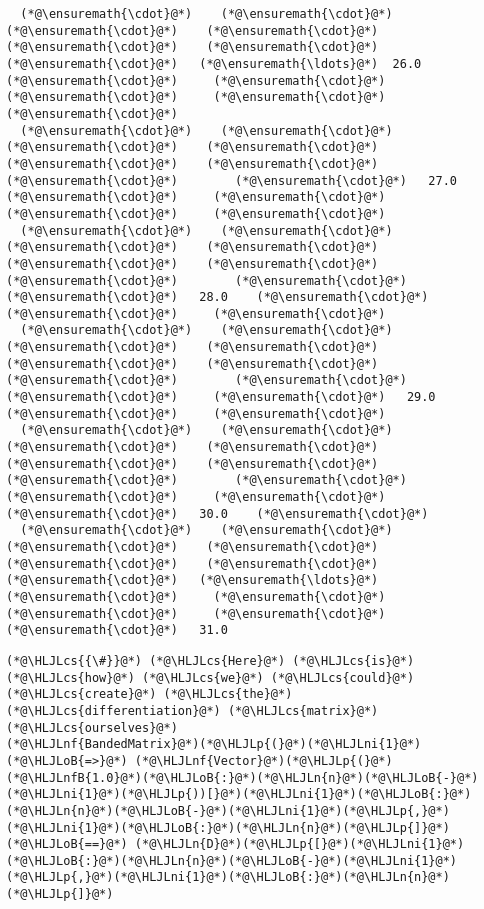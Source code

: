 \documentclass[12pt,a4paper]{article}
\newcommand{\HLJLn}[1]{#1}
\newcommand{\HLJLnf}[1]{\textcolor[RGB]{66,102,213}{#1}}
\newcommand{\HLJLnfB}[1]{\textcolor[RGB]{59,151,46}{#1}}
\newcommand{\HLJLni}[1]{\textcolor[RGB]{59,151,46}{#1}}
\newcommand{\HLJLoB}[1]{\textcolor[RGB]{102,102,102}{\textbf{#1}}}
\newcommand{\HLJLp}[1]{#1}
\newcommand{\HLJLcs}[1]{\textcolor[RGB]{153,153,119}{\textit{#1}}}
\begin{document}
\begin{lstlisting}
  (*@\ensuremath{\cdot}@*)    (*@\ensuremath{\cdot}@*)    (*@\ensuremath{\cdot}@*)    (*@\ensuremath{\cdot}@*)    (*@\ensuremath{\cdot}@*)    (*@\ensuremath{\cdot}@*)    (*@\ensuremath{\cdot}@*)   (*@\ensuremath{\ldots}@*)  26.0    (*@\ensuremath{\cdot}@*)     (*@\ensuremath{\cdot}@*)     (*@\ensuremath{\cdot}@*)     (*@\ensuremath{\cdot}@*)     (*@\ensuremath{\cdot}@*) 
  (*@\ensuremath{\cdot}@*)    (*@\ensuremath{\cdot}@*)    (*@\ensuremath{\cdot}@*)    (*@\ensuremath{\cdot}@*)    (*@\ensuremath{\cdot}@*)    (*@\ensuremath{\cdot}@*)    (*@\ensuremath{\cdot}@*)        (*@\ensuremath{\cdot}@*)   27.0    (*@\ensuremath{\cdot}@*)     (*@\ensuremath{\cdot}@*)     (*@\ensuremath{\cdot}@*)     (*@\ensuremath{\cdot}@*) 
  (*@\ensuremath{\cdot}@*)    (*@\ensuremath{\cdot}@*)    (*@\ensuremath{\cdot}@*)    (*@\ensuremath{\cdot}@*)    (*@\ensuremath{\cdot}@*)    (*@\ensuremath{\cdot}@*)    (*@\ensuremath{\cdot}@*)        (*@\ensuremath{\cdot}@*)     (*@\ensuremath{\cdot}@*)   28.0    (*@\ensuremath{\cdot}@*)     (*@\ensuremath{\cdot}@*)     (*@\ensuremath{\cdot}@*) 
  (*@\ensuremath{\cdot}@*)    (*@\ensuremath{\cdot}@*)    (*@\ensuremath{\cdot}@*)    (*@\ensuremath{\cdot}@*)    (*@\ensuremath{\cdot}@*)    (*@\ensuremath{\cdot}@*)    (*@\ensuremath{\cdot}@*)        (*@\ensuremath{\cdot}@*)     (*@\ensuremath{\cdot}@*)     (*@\ensuremath{\cdot}@*)   29.0    (*@\ensuremath{\cdot}@*)     (*@\ensuremath{\cdot}@*) 
  (*@\ensuremath{\cdot}@*)    (*@\ensuremath{\cdot}@*)    (*@\ensuremath{\cdot}@*)    (*@\ensuremath{\cdot}@*)    (*@\ensuremath{\cdot}@*)    (*@\ensuremath{\cdot}@*)    (*@\ensuremath{\cdot}@*)        (*@\ensuremath{\cdot}@*)     (*@\ensuremath{\cdot}@*)     (*@\ensuremath{\cdot}@*)     (*@\ensuremath{\cdot}@*)   30.0    (*@\ensuremath{\cdot}@*) 
  (*@\ensuremath{\cdot}@*)    (*@\ensuremath{\cdot}@*)    (*@\ensuremath{\cdot}@*)    (*@\ensuremath{\cdot}@*)    (*@\ensuremath{\cdot}@*)    (*@\ensuremath{\cdot}@*)    (*@\ensuremath{\cdot}@*)   (*@\ensuremath{\ldots}@*)    (*@\ensuremath{\cdot}@*)     (*@\ensuremath{\cdot}@*)     (*@\ensuremath{\cdot}@*)     (*@\ensuremath{\cdot}@*)     (*@\ensuremath{\cdot}@*)   31.0
\end{lstlisting}


\begin{lstlisting}
(*@\HLJLcs{{\#}}@*) (*@\HLJLcs{Here}@*) (*@\HLJLcs{is}@*) (*@\HLJLcs{how}@*) (*@\HLJLcs{we}@*) (*@\HLJLcs{could}@*) (*@\HLJLcs{create}@*) (*@\HLJLcs{the}@*) (*@\HLJLcs{differentiation}@*) (*@\HLJLcs{matrix}@*) (*@\HLJLcs{ourselves}@*)
(*@\HLJLnf{BandedMatrix}@*)(*@\HLJLp{(}@*)(*@\HLJLni{1}@*) (*@\HLJLoB{=>}@*) (*@\HLJLnf{Vector}@*)(*@\HLJLp{(}@*)(*@\HLJLnfB{1.0}@*)(*@\HLJLoB{:}@*)(*@\HLJLn{n}@*)(*@\HLJLoB{-}@*)(*@\HLJLni{1}@*)(*@\HLJLp{))[}@*)(*@\HLJLni{1}@*)(*@\HLJLoB{:}@*)(*@\HLJLn{n}@*)(*@\HLJLoB{-}@*)(*@\HLJLni{1}@*)(*@\HLJLp{,}@*)(*@\HLJLni{1}@*)(*@\HLJLoB{:}@*)(*@\HLJLn{n}@*)(*@\HLJLp{]}@*) (*@\HLJLoB{==}@*) (*@\HLJLn{D}@*)(*@\HLJLp{[}@*)(*@\HLJLni{1}@*)(*@\HLJLoB{:}@*)(*@\HLJLn{n}@*)(*@\HLJLoB{-}@*)(*@\HLJLni{1}@*)(*@\HLJLp{,}@*)(*@\HLJLni{1}@*)(*@\HLJLoB{:}@*)(*@\HLJLn{n}@*)(*@\HLJLp{]}@*)
\end{lstlisting}
\end{document}
